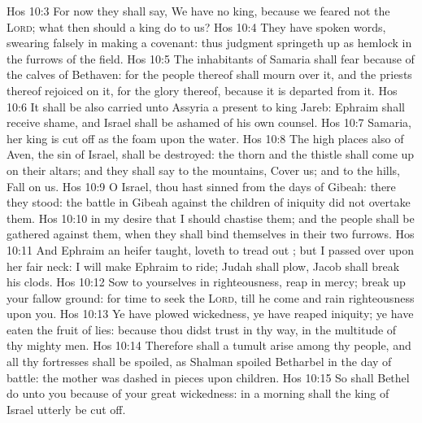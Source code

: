 \vs Hos 10:3 For now they shall say, We have no king, because we feared not the \textsc{Lord}; what then should a king do to us?
\vs Hos 10:4 They have spoken words, swearing falsely in making a covenant: thus judgment springeth up as hemlock in the furrows of the field.
\vs Hos 10:5 The inhabitants of Samaria shall fear because of the calves of Bethaven: for the people thereof shall mourn over it, and the priests thereof  rejoiced on it, for the glory thereof, because it is departed from it.
\vs Hos 10:6 It shall be also carried unto Assyria  a present to king Jareb: Ephraim shall receive shame, and Israel shall be ashamed of his own counsel.
\vs Hos 10:7  Samaria, her king is cut off as the foam upon the water.
\vs Hos 10:8 The high places also of Aven, the sin of Israel, shall be destroyed: the thorn and the thistle shall come up on their altars; and they shall say to the mountains, Cover us; and to the hills, Fall on us.
\vs Hos 10:9 O Israel, thou hast sinned from the days of Gibeah: there they stood: the battle in Gibeah against the children of iniquity did not overtake them.
\vs Hos 10:10  in my desire that I should chastise them; and the people shall be gathered against them, when they shall bind themselves in their two furrows.
\vs Hos 10:11 And Ephraim  an heifer  taught,  loveth to tread out ; but I passed over upon her fair neck: I will make Ephraim to ride; Judah shall plow,  Jacob shall break his clods.
\vs Hos 10:12 Sow to yourselves in righteousness, reap in mercy; break up your fallow ground: for  time to seek the \textsc{Lord}, till he come and rain righteousness upon you.
\vs Hos 10:13 Ye have plowed wickedness, ye have reaped iniquity; ye have eaten the fruit of lies: because thou didst trust in thy way, in the multitude of thy mighty men.
\vs Hos 10:14 Therefore shall a tumult arise among thy people, and all thy fortresses shall be spoiled, as Shalman spoiled Betharbel in the day of battle: the mother was dashed in pieces upon  children.
\vs Hos 10:15 So shall Bethel do unto you because of your great wickedness: in a morning shall the king of Israel utterly be cut off.
